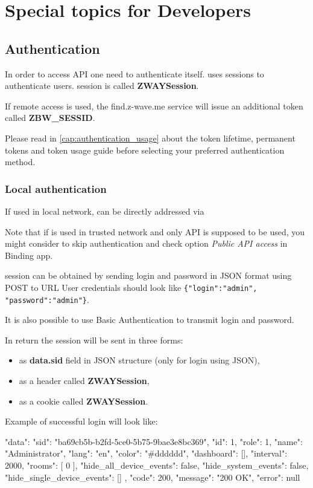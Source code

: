 \chapter{Special topics for Developers}

\section{Authentication}
\label{cap:authentication}

In order to access API one need to authenticate itself. \zway uses sessions
to authenticate users. \zway session is called \textbf{ZWAYSession}.

If remote access is used, the find.z-wave.me service will issue an additional token called \textbf{ZBW\_SESSID}.

Please read in \ref{cap:authentication_usage} about the token lifetime, permanent tokens and token usage guide before selecting your preferred authentication method.

\subsection{Local authentication}
\label{cap:authentication_local}

If used in local network, \zway can be directly addressed via 

Note that if \zway is used in trusted network and only \zwave API is supposed to be used, you might consider to skip authentication and check option \textit{Public API access} in \zwave Binding app.

\zway session can be obtained by sending login and password
in JSON format using POST to URL 
User credentials should look like \texttt{\{"login":"admin", "password":"admin"\}}.

It is also possible to use Basic Authentication to transmit login and password.

In return the session will be sent in three forms:
\begin{itemize}
\item as \textbf{data.sid} field in JSON structure (only for login using JSON),
\item as a header called \textbf{ZWAYSession},
\item as a cookie called \textbf{ZWAYSession}.
\end{itemize}

Example of successful login will look like:
\begin{listingverbatim}
{
    "data": {
        "sid": "ba69cb5b-b2fd-5ce0-5b75-9bae3e8bc369",
        "id": 1,
        "role": 1,
        "name": "Administrator",
        "lang": "en",
        "color": "#dddddd",
        "dashboard": [],
        "interval": 2000,
        "rooms": [
            0
        ],
        "hide_all_device_events": false,
        "hide_system_events": false,
        "hide_single_device_events": []
    },
    "code": 200,
    "message": "200 OK",
    "error": null
}
\end{listingverbatim}

